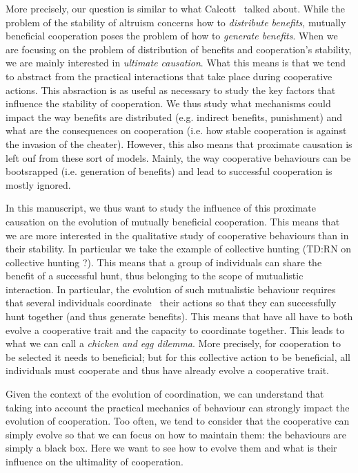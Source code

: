     More precisely, our question is similar to what Calcott~\cite{Calcott2008} talked about. While the problem of the stability of altruism concerns how to \emph{distribute benefits}, mutually beneficial cooperation poses the problem of how to \emph{generate benefits}. When we are focusing on the problem of distribution of benefits and cooperation's stability, we are mainly interested in \emph{ultimate causation}. What this means is that we tend to abstract from the practical interactions that take place during cooperative actions. This absraction is as useful as necessary to study the key factors that influence the stability of cooperation. We thus study what mechanisms could impact the way benefits are distributed (e.g. indirect benefits, punishment) and what are the consequences on cooperation (i.e. how stable cooperation is against the invasion of the cheater). However, this also means that proximate causation is left ouf from these sort of models. Mainly, the way cooperative behaviours can be bootsrapped (i.e. generation of benefits) and lead to successful cooperation is mostly ignored.

    In this manuscript, we thus want to study the influence of this proximate causation on the evolution of mutually beneficial cooperation. This means that we are more interested in the qualitative study of cooperative behaviours than in their stability. In particular we take the example of collective hunting (TD:RN on collective hunting ?). This means that a group of individuals can share the benefit of a successful hunt, thus belonging to the scope of mutualistic interaction. In particular, the evolution of such mutualistic behaviour requires that several individuals coordinate~\cite{Alvard2001, Alvard2003, Drea2009, Leimar2003} their actions so that they can successfully hunt together (and thus generate benefits). This means that have all have to both evolve a cooperative trait and the capacity to coordinate together. This leads to what we can call a \emph{chicken and egg dilemma}. More precisely, for cooperation to be selected it needs to beneficial; but for this collective action to be beneficial, all individuals must cooperate and thus have already evolve a cooperative trait.

    Given the context of the evolution of coordination, we can understand that taking into account the practical mechanics of behaviour can strongly impact the evolution of cooperation. Too often, we tend to consider that the cooperative can simply evolve so that we can focus on how to maintain them: the behaviours are simply a black box. Here we want to see how to evolve them and what is their influence on the ultimality of cooperation.

